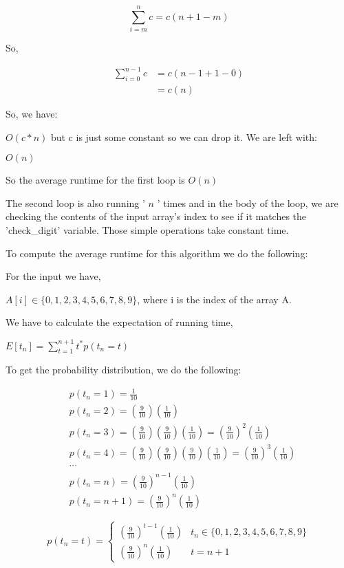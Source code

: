 \documentclass[10pt]{article}
\begin{document}
$$
\sum_{i=m}^{n} c=c(n+1-m)
$$

So,

$$
\begin{aligned}
\sum_{i=0}^{n-1} c & =c(n-1+1-0) \\
& =c(n)
\end{aligned}
$$

So, we have:

$O(c * n)$ but c is just some constant so we can drop it. We are left with:

$O(n)$

So the average runtime for the first loop is $O(n)$

The second loop is also running ' $n$ ' times and in the body of the loop, we are checking the contents of the input array's index to see if it matches the 'check\_digit' variable. Those simple operations take constant time.

To compute the average runtime for this algorithm we do the following:

For the input we have,

$A[i] \in\{0,1,2,3,4,5,6,7,8,9\}$, where $\mathrm{i}$ is the index of the array $\mathrm{A}$.

We have to calculate the expectation of running time,

$E\left[t_{n}\right]=\sum_{t=1}^{n+1} t^{*} p\left(t_{n}=t\right)$

To get the probability distribution, we do the following:

$$
\begin{aligned}
& p\left(t_{n}=1\right)=\frac{1}{10} \\
& p\left(t_{n}=2\right)=\left(\frac{9}{10}\right)\left(\frac{1}{10}\right) \\
& p\left(t_{n}=3\right)=\left(\frac{9}{10}\right)\left(\frac{9}{10}\right)\left(\frac{1}{10}\right)=\left(\frac{9}{10}\right)^{2}\left(\frac{1}{10}\right) \\
& p\left(t_{n}=4\right)=\left(\frac{9}{10}\right)\left(\frac{9}{10}\right)\left(\frac{9}{10}\right)\left(\frac{1}{10}\right)=\left(\frac{9}{10}\right)^{3}\left(\frac{1}{10}\right) \\
& \cdots \\
& p\left(t_{n}=n\right)=\left(\frac{9}{10}\right)^{n-1}\left(\frac{1}{10}\right) \\
& p\left(t_{n}=n+1\right)=\left(\frac{9}{10}\right)^{n}\left(\frac{1}{10}\right)
\end{aligned}
$$

$$
p\left(t_{n}=t\right)=\left\{\begin{array}{cc}
\left(\frac{9}{10}\right)^{t-1}\left(\frac{1}{10}\right) & t_{n} \in\{0,1,2,3,4,5,6,7,8,9\} \\
\left(\frac{9}{10}\right)^{n}\left(\frac{1}{10}\right) & t=n+1
\end{array}\right.
$$
\end{document}
